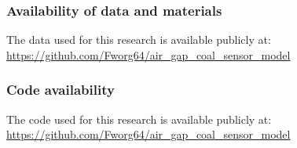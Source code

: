 \subsubsection*{Availability of data and materials}
The data used for this research is available publicly at: \\
\url{https://github.com/Fworg64/air_gap_coal_sensor_model}

\subsubsection*{Code availability }
The code used for this research is available publicly at: \\
\url{https://github.com/Fworg64/air_gap_coal_sensor_model}

